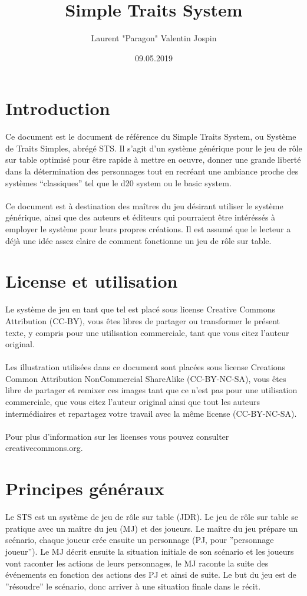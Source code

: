 \documentclass[a4paper,10pt,twoside,twocolumn]{article}
\author{Laurent "Paragon" Valentin Jospin}
\title{Simple Traits System}
\date{09.05.2019}
\begin{document}
  \maketitle
 
 \section{Introduction}
 
 Ce document est le document de référence du Simple Traits System, ou Système de Traits Simples, abrégé STS. Il s'agit d'un système générique pour le jeu de rôle sur table optimisé pour être rapide à mettre en oeuvre, donner une grande liberté dans la détermination des personnages tout en recréant une ambiance proche des systèmes ``classiques'' tel que le d20 system ou le basic system.\\
 \\
 Ce document est à destination des maîtres du jeu désirant utiliser le système générique, ainsi que des auteurs et éditeurs qui pourraient être intéréssés à employer le système pour leurs propres créations. Il est assumé que le lecteur a déjà une idée assez claire de comment fonctionne un jeu de rôle sur table.
 
 \section{License et utilisation}
 
 Le système de jeu en tant que tel est placé sous license Creative Commons Attribution (CC-BY), vous êtes libres de partager ou transformer le présent texte, y compris pour une utilisation commerciale, tant que vous citez l'auteur original.\\
 \\
 Les illustration utilisées dans ce document sont placées sous license Creations Common Attribution NonCommercial ShareAlike (CC-BY-NC-SA), vous êtes libre de partager et remixer ces images tant que ce n'est pas pour une utilisation commerciale, que vous citez l'auteur original ainsi que tout les auteurs intermédiaires et repartagez votre travail avec la même license (CC-BY-NC-SA).\\
 \\
 Pour plus d'information sur les licenses vous pouvez consulter creativecommons.org.
 
 \section{Principes généraux}
 \label{princip}
 Le STS est un système de jeu de rôle sur table (JDR). Le jeu de rôle sur table se pratique avec un maître du jeu (MJ) et des joueurs. Le maître du jeu prépare un scénario, chaque joueur crée ensuite un personnage (PJ, pour ''personnage joueur''). Le MJ décrit ensuite la situation initiale de son scénario et les joueurs vont raconter les actions de leurs personnages, le MJ raconte la suite des événements en fonction des actions des PJ et ainsi de suite. Le but du jeu est de ''résoudre'' le scénario, donc arriver à une situation finale dans le récit.
 
\end{document}
